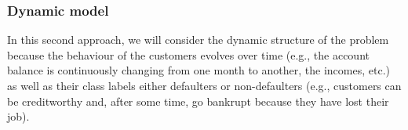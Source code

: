 

\subsubsection*{Dynamic model} 

In this second approach, we will consider the dynamic structure of the problem because the behaviour of the customers evolves over time (e.g., the account balance is continuously changing from one month to another, the incomes, etc.) as well as their class labels either defaulters or non-defaulters (e.g., customers can be creditworthy and, after some time, go bankrupt because they have lost their job). 


